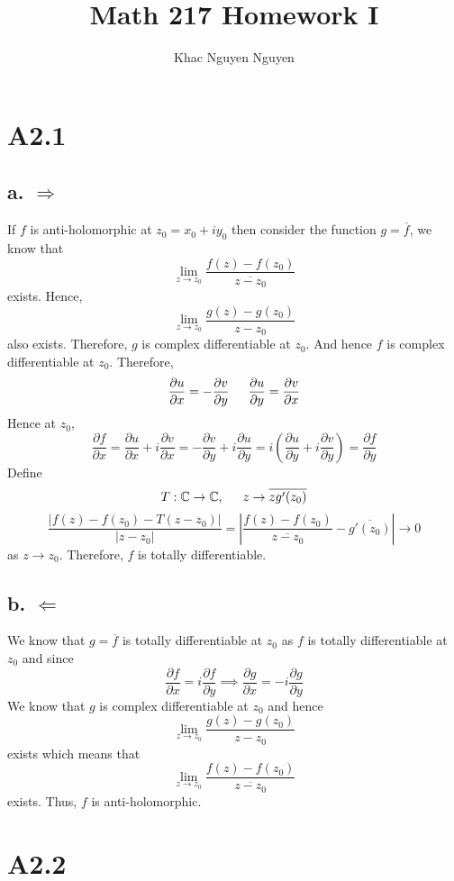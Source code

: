 \documentclass[11pt]{report}
\title{\textbf{Math 217 Homework I}}
\author{Khac Nguyen Nguyen}
\date{}
\begin{document}
\section*{A2.1}
\subsection*{a. $\Rightarrow$}
If $f$ is anti-holomorphic at $z_0 = x_0 + iy_0$ then consider the function $g = \overline{f}$, we know that
\[
    \lim_{z \to z_0} \frac{f(z)-f(z_0)}{\overline{z-z_0}}
\]
exists. Hence,
\[
    \lim_{z \to z_0} \frac{g(z) - g(z_0)}{z-z_0}
\]
also exists. Therefore, $g$ is complex differentiable at $z_0$. And hence $f$ is complex differentiable at $z_0$. Therefore,
\[
    \frac{\partial u}{\partial x} = -\frac{\partial v}{\partial y}  \indent \frac{\partial u}{\partial y} = \frac{\partial v}{\partial x}
\]
Hence at $z_0$,
\[
    \frac{\partial f}{\partial x} = \frac{\partial u}{\partial x} + i\frac{\partial v}{\partial x}
    = - \frac{\partial v}{\partial y} + i \frac{\partial u}{\partial y}
    = i \left( \frac{\partial u}{\partial y} +i \frac{\partial v}{\partial y} \right)
    = \frac{\partial f}{\partial y}
\]
Define
\[
    T: \mathbb{C} \to \mathbb{C}, \indent z \to \overline{ z g'(z_0)}
\]
\[
    \frac{|f(z) - f(z_0) - T(z-z_0)|}{|z-z_0|} = \left| \frac{f(z) - f(z_0)}{\overline{z-z_0}} - \overline{g'(z_0)}\right| \to 0
\]
as $z\to z_0$. Therefore, $f$ is totally differentiable.
\subsection*{b. $\Leftarrow$}
We know that $g = \overline{f}$ is totally differentiable at $z_0$ as $f$ is totally differentiable at $z_0$ and since
\[
    \frac{\partial f}{\partial x} = i \frac{\partial f}{\partial y} \implies \frac{\partial g}{\partial x} = -i \frac{\partial g}{\partial y}
\]
We know that $g$ is complex differentiable at $z_0$ and hence
\[
    \lim_{z \to z_0} \frac{g(z) - g(z_0)}{z-z_0}
\]
exists which means that
\[
    \lim_{z \to z_0} \frac{f(z)-f(z_0)}{\overline{z-z_0}}
\]
exists. Thus, $f$ is anti-holomorphic.


\newpage
\section*{A2.2}
\end{document}
